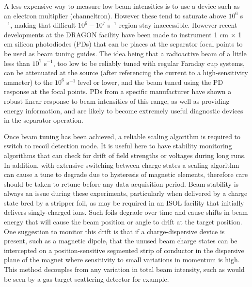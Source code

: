 A less expensive way to measure low beam intensities is to use a device such as an electron multiplier (channeltron). However these tend to saturate above $10^{6}$ s$^{-1}$, making that difficult $10^{6}-10^{7}$ s$^{-1}$ region stay inaccessible. However recent developments at the DRAGON facility \cite{chr14} have been made to instrument 1 cm $\times$ 1 cm silicon photodiodes (PDs) that can be places at the separator focal points to be used as beam tuning guides. The idea being that a radioactive beam of a little less than $10^{7}$ s$^{-1}$, too low to be reliably tuned with regular Faraday cup systems, can be attenuated at the source (after referencing the current to a high-sensitivity ammeter) to the $10^{6}$ s$^{-1}$ level or lower, and the beam tuned using the PD response at the focal points. PDs from a specific manufacturer have shown a robust linear response to beam intensities of this range, as well as providing energy information, and are likely to become extremely useful diagnostic devices in the separator operation.  

Once beam tuning has been achieved, a reliable scaling algorithm is required to switch to recoil detection mode. It is useful here to have stability monitoring algorithms that can check for drift of field strengths or voltages during long runs. In addition, with extensive switching between charge states a scaling algorithm can cause a tune to degrade due to hysteresis of magnetic elements, therefore care should be taken to retune before any data acquisition period. Beam stability is always an issue during these experiments, particularly when delivered by a charge state bred by a stripper foil, as may be required in an ISOL facility that initially delivers singly-charged ions. Such foils degrade over time and cause shifts in beam energy that will cause the beam position or angle to drift at the target position. One suggestion to monitor this drift is that if a charge-dispersive device is present, such as a magnetic dipole, that the unused beam charge states can be intercepted on a position-sensitive segmented strip of conductor in the dispersive plane of the magnet where sensitivity to small variations in momentum is high. This method decouples from any variation in total beam intensity, such as would be seen by a gas target scattering detector for example.

